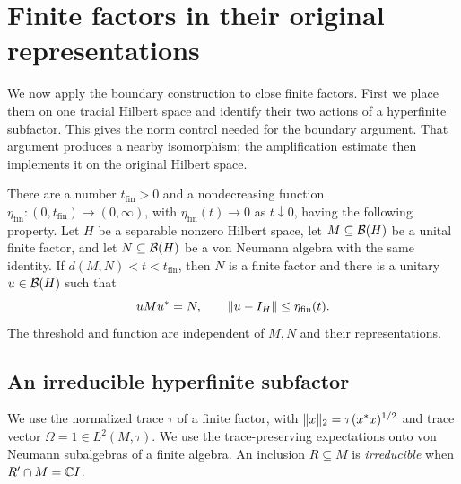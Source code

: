 \section{Finite factors in their original representations}
\label{sec:finite}

We now apply the boundary construction to close finite factors.  First we
place them on one tracial Hilbert space and identify their two actions of a
hyperfinite subfactor.  This gives the norm control needed for the boundary
argument.  That argument produces a nearby isomorphism; the amplification
estimate then implements it on the original Hilbert space.

\begin{theorem}
\label{thm:finite}
There are a number $t_{\mathrm{fin}}>0$ and a nondecreasing function
$\eta_{\mathrm{fin}}:(0,t_{\mathrm{fin}})\to(0,\infty)$, with
$\eta_{\mathrm{fin}}(t)\to0$ as $t\downarrow0$, having the following
property.  Let $H$ be a separable nonzero Hilbert space, let
$M\subseteq\mathcal B(H)$ be a unital finite factor, and let $N\subseteq\mathcal B(H)$
be a von Neumann algebra with the same identity.  If $d(M,N)<t<t_{\mathrm{fin}}$,
then $N$ is a finite factor and there is a unitary $u\in\mathcal B(H)$ such that
\[
 uMu^*=N,\qquad \lVert u-I_H\rVert\le\eta_{\mathrm{fin}}(t).
\]
The threshold and function are independent of $M,N$ and their representations.
\end{theorem}

\subsection{An irreducible hyperfinite subfactor}

We use the normalized trace $\tau$ of a finite factor, with
$\lVert x\rVert_2=\tau(x^*x)^{1/2}$ and trace vector
$\Omega=1\in L^2(M,\tau)$.  We use the trace-preserving expectations
onto von Neumann subalgebras of a finite algebra.  An inclusion $R\subseteq M$ is
\emph{irreducible} when $R'\cap M=\mathbb C I$.

